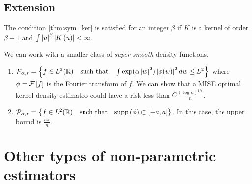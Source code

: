 \subsection{Extension}
\begin{remark}
    The condition \ref{thm:sym_ker} is satisfied for an integer $\beta$ if $K$ is a kernel of order $\beta-1$ and $\int \left| u\right|^\beta \left| K\left(u\right)\right|<\infty$.
\end{remark}
\begin{remark}
    We can work with a smaller class of \textit{super smooth} density functions.
    \begin{enumerate}
        \item $\mathcal{P}_{\alpha,r}=\left\{f\in L^2(\mathbb{R}) \quad \text{such that} \quad \int \exp(\alpha\left| w\right|^2)\left| \phi(w)\right|^2 dw \le L^2\right\}$ where $\phi=\mathcal{F}\left[f\right]$ is the Fourier transform of $f$. We can show that a MISE optimal kernel density estimatro could have a risk less than $C\frac{(\log n)^{1/r}}{n}$.
        \item $\mathcal{P}_{\alpha,r}=\left\{f\in L^2(\mathbb{R}) \quad \text{such that} \quad \text{supp}\left(\phi\right)\subset\left[-a,a\right]\right\}$. In this case, the upper bound is $\frac{a\pi}{n}$.
    \end{enumerate}
\end{remark}

\section{Other types of non-parametric estimators}
